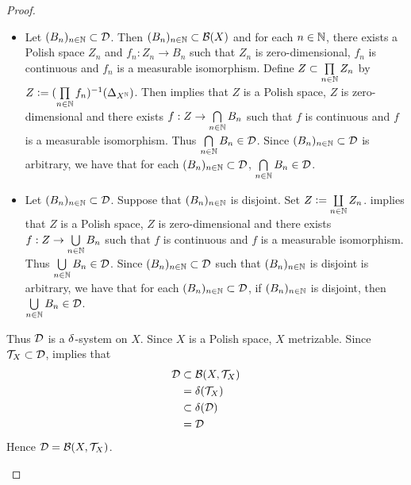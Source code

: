 \documentclass{book}
\begin{document}
\begin{proof}
\begin{enumerate}
\begin{itemize}
				\item Let $(B_n)_{n \in \mathbb{N}} \subset \mathcal{D}$. Then $(B_n)_{n \in \mathbb{N}} \subset \mathcal{B}(X)$ and for each $n \in \mathbb{N}$, there exists a Polish space $Z_n$ and $f_n:Z_n \rightarrow B_n$ such that $Z_n$ is zero-dimensional, $f_n$ is continuous and $f_n$ is a measurable isomorphism. Define $Z \subset \prod\limits_{n \in \mathbb{N}} Z_n$ by $Z \vcentcolon= (\prod\limits_{n \in \mathbb{N}} f_n)^{-1}(\Delta_{X^{\mathbb{N}}})$. Then  implies that $Z$ is a Polish space, $Z$ is zero-dimensional and there exists $f: Z \rightarrow \bigcap\limits_{n \in \mathbb{N}} B_n$ such that $f$ is continuous and $f$ is a measurable isomorphism. Thus $\bigcap\limits_{n \in \mathbb{N}} B_n \in \mathcal{D}$. Since $(B_n)_{n \in \mathbb{N}} \subset \mathcal{D}$ is arbitrary, we have that for each $(B_n)_{n \in \mathbb{N}} \subset \mathcal{D}$, $\bigcap\limits_{n \in \mathbb{N}} B_n \in \mathcal{D}$. 
				\item Let $(B_n)_{n \in \mathbb{N}} \subset \mathcal{D}$. Suppose that $(B_n)_{n \in \mathbb{N}}$ is disjoint. Set $Z \vcentcolon= \coprod\limits_{n \in \mathbb{N}} Z_n$.  implies that $Z$ is a Polish space, $Z$ is zero-dimensional and there exists $f: Z \rightarrow \bigcup\limits_{n \in \mathbb{N}} B_n$ such that $f$ is continuous and $f$ is a measurable isomorphism. Thus $\bigcup\limits_{n \in \mathbb{N}} B_n \in \mathcal{D}$. Since $(B_n)_{n \in \mathbb{N}} \subset \mathcal{D}$ such that $(B_n)_{n \in \mathbb{N}}$ is disjoint is arbitrary, we have that for each $(B_n)_{n \in \mathbb{N}} \subset \mathcal{D}$, if $(B_n)_{n \in \mathbb{N}}$ is disjoint, then $\bigcup\limits_{n \in \mathbb{N}} B_n \in \mathcal{D}$. 
			\end{itemize}
			Thus $\mathcal{D}$ is a $\delta$-system on $X$. Since $X$ is a Polish space, $X$ metrizable. Since $\mathcal{T}_X \subset \mathcal{D}$,   implies that
			\begin{align*}
				\mathcal{D} & \subset \mathcal{B}(X, \mathcal{T}_X) \\
				& = \delta(\mathcal{T}_X) \\
				& \subset \delta(\mathcal{D}) \\
				& = \mathcal{D} 
			\end{align*}
			Hence $\mathcal{D} = \mathcal{B}(X, \mathcal{T}_X)$. 
		\end{enumerate}
	\end{proof}
	
\end{document}
